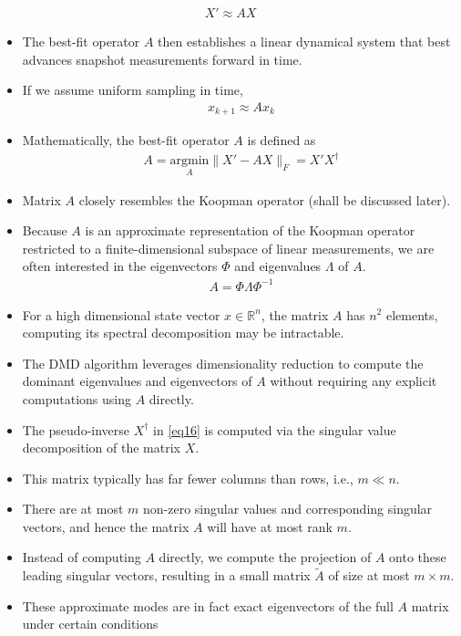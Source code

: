\documentclass[hyperref={pdfpagemode=FullScreen},aspectratio=169]{beamer}
\begin{document}
\begin{frame}{}
\begin{align}
X'\approx AX
\end{align}
\begin{itemize}
\setlength\itemsep{1em}
\item The best-fit operator $A$ then establishes a linear dynamical system that best advances snapshot measurements forward in time. 
\item If we assume uniform sampling in time, 
\begin{align}
x_{k+1} \approx Ax_k
\end{align}
\item Mathematically, the best-fit operator $A$ is defined as
\begin{align}\label{eq16}
A = \underset{A}{\text{argmin}} \lVert X'-AX\rVert_F = X'X^\dagger
\end{align}
\item Matrix $A$ closely resembles the Koopman operator (shall be discussed later).
\item Because $A$ is an approximate representation of the Koopman operator restricted to a finite-dimensional subspace of linear measurements, we are often interested in the eigenvectors $\Phi$ and eigenvalues $\Lambda$ of $A$.
\begin{align}
A = \Phi \Lambda \Phi^{-1}
\end{align}

\end{itemize}
\end{frame}
\begin{frame}{}
\begin{itemize}
\setlength\itemsep{1em}
\item For a high dimensional state vector $x\in \mathbb{R}^n$, the matrix $A$ has $n^2$ elements, computing its spectral 	decomposition may be intractable.
\item The DMD algorithm leverages dimensionality reduction to compute the dominant eigenvalues and eigenvectors of $A$ without requiring any explicit computations using $A$ directly.
\item The pseudo-inverse $X^\dagger$ in \cref{eq16} is computed via the singular value decomposition of the matrix $X$.
\item This matrix typically has far fewer columns than rows, i.e., $m \ll n$.
\item There are at most $m$ non-zero singular values and corresponding singular vectors, and hence the matrix $A$ will have at most rank $m$. 
\item Instead of computing $A$ directly, we compute the projection of $A$ onto these leading singular vectors, resulting in a small matrix $\tilde{A}$ of size at most $m \times m$.
\item These approximate modes are in fact exact eigenvectors of the full $A$ matrix under certain conditions
\end{itemize}
\end{frame}
\end{document}

